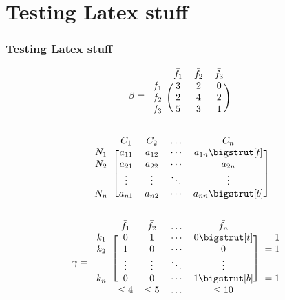 \documentclass{beamer}
\begin{document}
\section{Testing Latex stuff}
\begin{frame}
\frametitle{\textbf{Testing Latex stuff} }

\[
    \mathbf{\beta} = 
    \begin{blockarray}{cccc}
          & \bar{f_1} & \bar{f_2} & \bar{f_3} \\
        \begin{block}{c(ccc)}
          f_1 & 3 & 2 & 0 \\
          f_2 & 2 & 4 & 2 \\
          f_3 & 5 & 3 & 1 \\
        \end{block}
    \end{blockarray}
\]

\[
    \begin{blockarray}{ccccc}
        & C_1 & C_2 & \dots & C_n \\
    \begin{block}{c[cccc]}
    N_1 & a_{11} & a_{12} & \cdots & a_{1n} \bigstrut[t] \\
    N_2 & a_{21} & a_{22} & \cdots & a_{2n}              \\
        & \vdots & \vdots & \ddots & \vdots              \\
    N_n & a_{n1} & a_{n2} & \cdots & a_{nn} \bigstrut[b] \\
    \end{block}
    \end{blockarray}\vspace*{-1.25\baselineskip}
\]

\[
    \gamma  = 
    \begin{blockarray}{cccccc}
        & \bar{f_1} & \bar{f_2} & \dots & \bar{f_n} \\
    \begin{block}{c[cccc]c}
    k_1 & 0 & 1  & \cdots & 0\bigstrut[t] & =1 \\
    k_2 & 1 & 0  & \cdots & 0 & =1 \\
        & \vdots & \vdots & \ddots & \vdots &\\
    k_n & 0 & 0  & \cdots & 1\bigstrut[b] & =1\\
    \end{block}
        & \leq 4 & \leq 5 & \dots & \leq 10 & \\
    \end{blockarray}\vspace*{-1.25\baselineskip}
\]

\end{frame}
\end{document}
